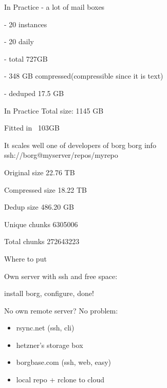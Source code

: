 \documentclass{beamer}
\begin{document}
\begin{frame}{In Practice}
	- a lot of mail boxes
	
	- 20 instances
	
	- 20 daily
	
	- total 727GB
	
	- 348 GB compressed(compressible since it is text)
	
	- deduped 17.5 GB
\end{frame}

\begin{frame}{In Practice}
	Total size: 1145 GB
	
	Fitted in ~103GB
\end{frame}

\begin{frame}{It scales well}
	one of developers of borg
	borg info ssh://borg@myserver/repos/myrepo
	
	Original size  22.76 TB
	
	 Compressed size 18.22 TB
	 
	   Dedup size 486.20 GB
	   
	Unique chunks 6305006
	
	         Total chunks                          272643223
\end{frame}

\begin{frame}{Where to put}
	
	Own server with ssh and free space:
	
	install borg, configure, done!
	
	No own remote server? No problem:
	\begin{itemize}
		\item rsync.net (ssh, cli)
		\item hetzner's storage box
		\item borgbase.com (ssh, web, easy)
		\item local repo + rclone to cloud
	\end{itemize}
\end{frame}
\end{document}
